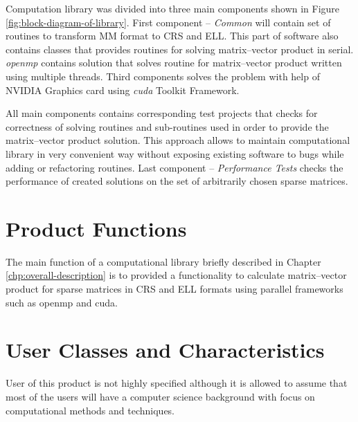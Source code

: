 	Computation library was divided into three main components shown in Figure \ref{fig:block-diagram-of-library}. First component -- \emph{Common} will contain set of routines to transform \gls{MM} format to \gls{CRS} and \gls{ELL}. This part of software also contains classes that provides routines for solving matrix--vector product in serial. \emph{\gls{openmp}} contains solution that solves routine for matrix--vector product written using multiple threads. Third components solves the problem with help of NVIDIA Graphics card using \emph{\gls{cuda}} Toolkit Framework. 
	
	All main components contains corresponding test projects that checks for correctness of solving routines and sub-routines used in order to provide the matrix--vector product solution. This approach allows to maintain computational library in very convenient way without exposing existing software to bugs while adding or refactoring routines. Last component -- \emph{Performance Tests} checks the performance of created solutions on the set of arbitrarily chosen sparse matrices.
\section{Product Functions}

	
	The main function of a computational library briefly described in Chapter \ref{chp:overall-description} is to provided a functionality to calculate matrix--vector product for sparse matrices in \gls{CRS} and \gls{ELL} formats using parallel frameworks such as \gls{openmp} and \gls{cuda}.
\section{User Classes and Characteristics}

	User of this product is not highly specified although it is allowed to assume that most of the users will have a computer science background with focus on computational methods and techniques. 
